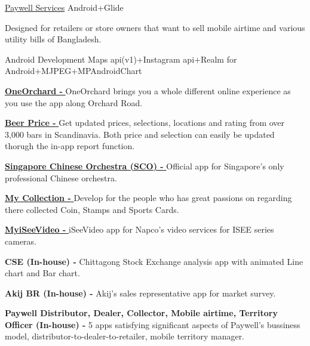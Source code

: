 \begin{projectentries}
    \projectentry 
    {\href{https://play.google.com/store/apps/details?id=com.cloudwell.paywell.services}{Paywell Services}} 
    {Android+Glide}
    {
      \begin{projectitems} %
        \item {Designed for retailers or store owners that want to sell mobile airtime and various utility bills of Bangladesh.}
      \end{projectitems}
    }

    \projectentry 
    {Android Development} 
    {Maps api(v1)+Instagram api+Realm for Android+MJPEG+MPAndroidChart}
    {
      \begin{projectitems} %
        \item {{\href{https://play.google.com/store/apps/details?id=com.orba.OneOrchard}{\textbf{OneOrchard - }}}
        OneOrchard brings you a whole different online experience as you use the app along Orchard Road.}
        \item {{\href{https://annanovas.com/portfolio/beer-prices-android/}{\textbf{Beer Price - }}}
        Get updated prices, selections, locations and rating from over 3,000 bars in Scandinavia. Both price and selection can easily be 
        updated thorugh the in-app report function.}  
        \item {{\href{https://play.google.com/store/apps/details?id=com.SingaporeChineseOrchestra.SCO}{\textbf{Singapore Chinese Orchestra (SCO) - }}}
        Official app for Singapore’s only professional Chinese orchestra.}  
        \item {{\href{https://annanovas.com/portfolio/my-collection/}{\textbf{My Collection - }}}
        Develop for the people who has great passions on regarding there collected Coin, Stamps and Sports Cards.}  
        \item {{\href{https://play.google.com/store/apps/details?id=com.napco.uidealer.myiseevideo}{\textbf{MyiSeeVideo - }}}
        iSeeVideo app for Napco's video services for ISEE series cameras.}  
        \item {\textbf{CSE (In-house) - }
        Chittagong Stock Exchange analysis app with animated Line chart and Bar chart.}  
        \item {\textbf{Akij BR (In-house) - }
        Akij's sales representative app for market survey.}  
        \item {\textbf{Paywell Distributor, Dealer, Collector, Mobile airtime, Territory Officer (In-house) - }
        5 apps satisfying significant aspects of Paywell's bussiness model, distributor-to-dealer-to-retailer, mobile territory manager.}  
      \end{projectitems}
    }
    


\end{projectentries}
